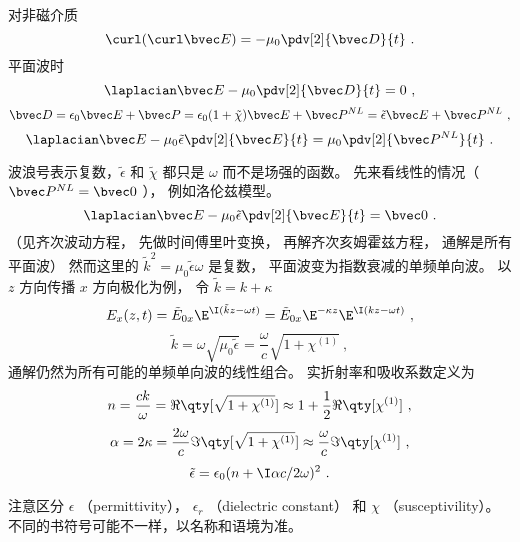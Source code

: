 
对非磁介质
\begin{equation}
\curl (\curl \bvec E) = -\mu_0 \pdv[2]{\bvec D}{t}~.
\end{equation}
平面波时
\begin{equation}
\laplacian \bvec E - \mu_0 \pdv[2]{\bvec D}{t} = 0~,
\end{equation}
\begin{equation}
\bvec D = \epsilon_0 \bvec E + \bvec P = \epsilon_0(1 + \tilde\chi)\bvec E + \bvec P^{NL} = \tilde \epsilon \bvec E + \bvec P^{NL}~,
\end{equation}
\begin{equation}
\laplacian\bvec E - \mu_0\tilde\epsilon \pdv[2]{\bvec E}{t} = \mu_0 \pdv[2]{\bvec P^{NL}}{t}~.
\end{equation}
 
波浪号表示复数，$\tilde\epsilon$ 和 $\tilde\chi$ 都只是 $\omega$ 而不是场强的函数。 先来看线性的情况（ $\bvec P^{NL} = \bvec 0$ ）， 例如洛伦兹模型。
\begin{equation}
\laplacian\bvec E - \mu_0 \tilde\epsilon \pdv[2]{\bvec E}{t} = \bvec 0~.
\end{equation}
（见齐次波动方程， 先做时间傅里叶变换， 再解齐次亥姆霍兹方程， 通解是所有平面波） 然而这里的 $\tilde k^2 = \mu_0 \tilde \epsilon \omega$ 是复数， 平面波变为指数衰减的单频单向波。 以 $z$ 方向传播 $x$ 方向极化为例， 令  $\tilde k = k + \kappa$
\begin{equation}
E_x(z,t) = \tilde E_{0x} \E^{\I(\tilde kz - \omega t)} = \tilde E_{0x} \E^{-\kappa z} \E^{\I(kz - \omega t)}~,
\end{equation}
\begin{equation}
\tilde k = \omega \sqrt{\mu_0\tilde\epsilon} = \frac{\omega }{c}\sqrt {1 + \chi ^{(1)}}~,
\end{equation}
通解仍然为所有可能的单频单向波的线性组合。 实折射率和吸收系数定义为
\begin{equation}
n = \frac{ck}{\omega } = \Re\qty[\sqrt{1 + \chi ^{(1)}}] \approx 1 + \frac12 \Re\qty[\chi^{(1)}]~,
\end{equation}
\begin{equation}
\alpha  = 2\kappa  = \frac{2\omega}{c} \Im\qty[\sqrt{1+\chi^{(1)}}] \approx \frac{\omega}{c}\Im\qty[\chi ^{(1)}]~,
\end{equation}
\begin{equation}
\tilde \epsilon  = \epsilon_0 (n + \I \alpha c/2\omega )^2~.
\end{equation}
 
注意区分 $\epsilon$ （permittivity）， $\epsilon_r$ （dielectric constant） 和 $\chi$ （susceptivility）。 不同的书符号可能不一样，以名称和语境为准。

